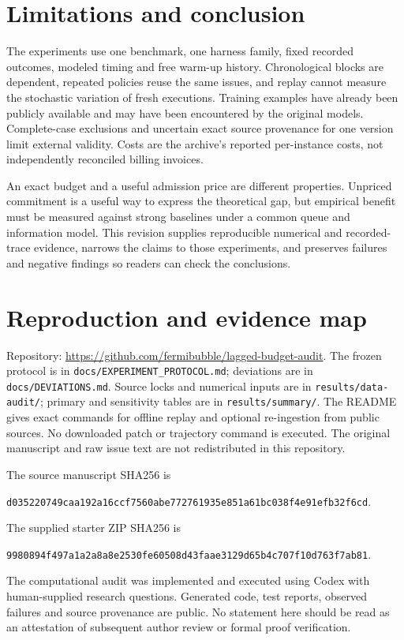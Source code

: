 \documentclass[11pt]{article}
\newcommand{\repo}{\url{https://github.com/fermibubble/lagged-budget-audit}}
\begin{document}
\section{Limitations and conclusion}
The experiments use one benchmark, one harness family, fixed recorded outcomes, modeled timing and free warm-up history. Chronological blocks are dependent, repeated policies reuse the same issues, and replay cannot measure the stochastic variation of fresh executions. Training examples have already been publicly available and may have been encountered by the original models. Complete-case exclusions and uncertain exact source provenance for one version limit external validity. Costs are the archive's reported per-instance costs, not independently reconciled billing invoices.

An exact budget and a useful admission price are different properties. Unpriced commitment is a useful way to express the theoretical gap, but empirical benefit must be measured against strong baselines under a common queue and information model. This revision supplies reproducible numerical and recorded-trace evidence, narrows the claims to those experiments, and preserves failures and negative findings so readers can check the conclusions.

\appendix
\section{Reproduction and evidence map}
Repository: \repo. The frozen protocol is in \texttt{docs/EXPERIMENT\_PROTOCOL.md}; deviations are in \texttt{docs/DEVIATIONS.md}. Source locks and numerical inputs are in \texttt{results/data-audit/}; primary and sensitivity tables are in \texttt{results/summary/}. The README gives exact commands for offline replay and optional re-ingestion from public sources. No downloaded patch or trajectory command is executed. The original manuscript and raw issue text are not redistributed in this repository.

The source manuscript SHA256 is\par\noindent\texttt{\small d035220749caa192a16ccf7560abe772761935e851a61bc038f4e91efb32f6cd}.\par
The supplied starter ZIP SHA256 is\par\noindent\texttt{\small 9980894f497a1a2a8a8e2530fe60508d43faae3129d65b4c707f10d763f7ab81}.\par
The computational audit was implemented and executed using Codex with human-supplied research questions. Generated code, test reports, observed failures and source provenance are public. No statement here should be read as an attestation of subsequent author review or formal proof verification.
\end{document}

